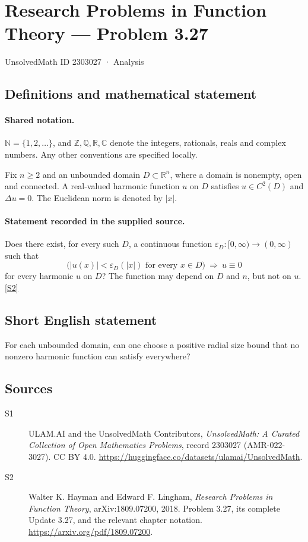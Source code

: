 \documentclass[11pt]{book}
\newcommand{\sref}[2]{\hyperlink{source:#1:#2}{[S#2]}}
\begin{document}
\setcounter{section}{2303026}
\section{Research Problems in Function Theory — Problem 3.27}\label{2303027}
{\small\sffamily UnsolvedMath ID 2303027 · Analysis}
\subsection{Definitions and mathematical statement}

\paragraph{Shared notation.}$\mathbb N=\{1,2,\ldots\}$, and $\mathbb Z,\mathbb Q,\mathbb R,\mathbb C$ denote the integers, rationals, reals and complex numbers. Any other conventions are specified locally.


Fix $n\ge2$ and an unbounded domain $D\subset\mathbb R^n$, where a domain is nonempty, open and connected. A real-valued harmonic function $u$ on $D$ satisfies $u\in C^2(D)$ and $\Delta u=0$. The Euclidean norm is denoted by $|x|$.
\paragraph{Statement recorded in the supplied source.}
Does there exist, for every such $D$, a continuous function $\varepsilon_D:[0,\infty)\to(0,\infty)$ such that
\[\bigl(|u(x)|<\varepsilon_D(|x|)\text{ for every }x\in D\bigr)\ \Longrightarrow\ u\equiv0
\]
for every harmonic $u$ on $D$? The function may depend on $D$ and $n$, but not on $u$. \sref{2303027}{2}
\subsection{Short English statement}
For each unbounded domain, can one choose a positive radial size bound that no nonzero harmonic function can satisfy everywhere?
\subsection{Sources}
\begin{description}
\item[\hypertarget{source:2303027:1}{S1}] ULAM.AI and the UnsolvedMath Contributors, \emph{UnsolvedMath: A Curated Collection of Open Mathematics Problems}, record 2303027 (AMR-022-3027). CC BY 4.0. \url{https://huggingface.co/datasets/ulamai/UnsolvedMath}.
\item[\hypertarget{source:2303027:2}{S2}] Walter K. Hayman and Edward F. Lingham, \emph{Research Problems in Function Theory}, arXiv:1809.07200, 2018. Problem 3.27, its complete Update 3.27, and the relevant chapter notation. \url{https://arxiv.org/pdf/1809.07200}.
\end{description}
\label{end:2303027}
\end{document}
